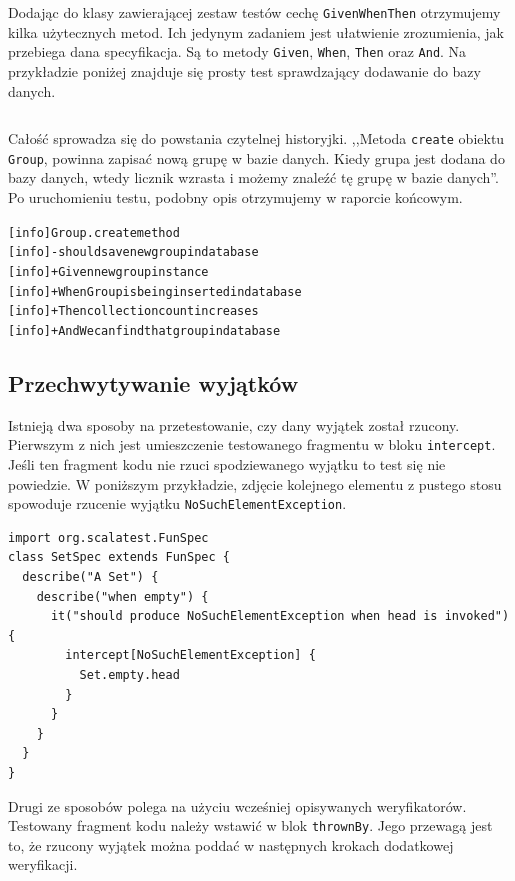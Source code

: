 \documentclass[brudnopis]{xmgr}
\begin{document}
Dodając do klasy zawierającej zestaw testów cechę \texttt{GivenWhenThen} otrzymujemy kilka użytecznych metod. Ich jedynym zadaniem jest ułatwienie zrozumienia, jak przebiega dana specyfikacja. Są to metody \texttt{Given}, \texttt{When}, \texttt{Then} oraz \texttt{And}. Na przykładzie poniżej znajduje się prosty test sprawdzający dodawanie do bazy danych.

\inputminted[fontsize=\small]{scala}{code/givenWhenThen.scala}

Całość sprowadza się do powstania czytelnej historyjki. ,,Metoda \texttt{create} obiektu \texttt{Group}, powinna zapisać nową grupę w bazie danych. Kiedy grupa jest dodana do bazy danych, wtedy licznik wzrasta i możemy znaleźć tę grupę w bazie danych''. Po uruchomieniu testu, podobny opis otrzymujemy w raporcie końcowym. 

\begin{alltt}
[info] Group.create method
[info] - should save new group in database
[info]   + Given new group instance
[info]   + When Group is being inserted in database 
[info]   + Then collection count increases 
[info]   + And We can find that group in database
\end{alltt}

\subsection{Przechwytywanie wyjątków}

Istnieją dwa sposoby na przetestowanie, czy dany wyjątek został rzucony. Pierwszym z nich jest umieszczenie testowanego fragmentu w bloku \texttt{intercept}. Jeśli ten fragment kodu nie rzuci spodziewanego wyjątku to test się nie powiedzie. W poniższym przykładzie, zdjęcie kolejnego elementu z pustego stosu spowoduje rzucenie wyjątku \texttt{NoSuchElementException}.

\begin{verbatim}
import org.scalatest.FunSpec
class SetSpec extends FunSpec {
  describe("A Set") {
    describe("when empty") {
      it("should produce NoSuchElementException when head is invoked") {
        intercept[NoSuchElementException] {
          Set.empty.head
        }
      }
    }
  }
}
\end{verbatim}

Drugi ze sposobów polega na użyciu wcześniej opisywanych weryfikatorów. Testowany fragment kodu należy wstawić w blok \texttt{thrownBy}. Jego przewagą jest to, że rzucony wyjątek można poddać w następnych krokach dodatkowej weryfikacji.
\end{document}
